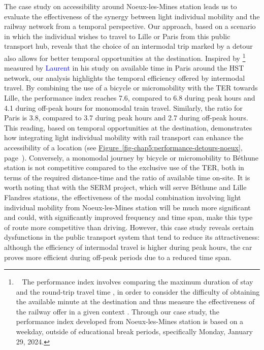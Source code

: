 \begin{refsegment}
The case study on accessibility around Noeux-les-Mines station leads us to evaluate the effectiveness of the synergy between light individual mobility and the railway network from a temporal perspective. Our approach, based on a scenario in which the individual wishes to travel to Lille or Paris from this public transport hub, reveals that the choice of an intermodal trip marked by a detour also allows for better temporal opportunities at the destination. Inspired by \footnote{~
The performance index involves comparing the maximum duration of stay and the round-trip travel time \textcolor{blue}{\autocite[]{cauvin_accessibilite_1989}}, in order to consider the difficulty of obtaining the available minute at the destination and thus measure the effectiveness of the railway offer in a given context \textcolor{blue}{\autocite[130]{chapelon_transports_2016}}. Through our case study, the performance index developed from Noeux-les-Mines station is based on a weekday, outside of educational break periods, specifically Monday, January 29, 2024.
} measured by \textcolor{blue}{Laurent} \textcolor{blue}{\textcite[130]{chapelon_transports_2016}} in his study on available time in Paris around the \acrshort{HST} network, our analysis highlights the temporal efficiency offered by intermodal travel. By combining the use of a bicycle or micromobility with the \acrshort{TER} towards Lille, the performance index reaches 7.6, compared to 6.8 during peak hours and 4.1 during off-peak hours for monomodal train travel. Similarly, the ratio for Paris is 3.8, compared to 3.7 during peak hours and 2.7 during off-peak hours. This reading, based on temporal opportunities at the destination, demonstrates how integrating light individual mobility with rail transport can enhance the accessibility of a location (see \hyperref[fig-chap5:performance-detours-noeux]{Figure~\ref{fig-chap5:performance-detours-noeux}}, page~\pageref{fig-chap5:performance-detours-noeux}). Conversely, a monomodal journey by bicycle or micromobility to Béthune station is not competitive compared to the exclusive use of the \acrshort{TER}, both in terms of the required distance-time and the ratio of available time on-site. It is worth noting that with the \acrfull{SERM} project, which will serve Béthune and Lille Flandres stations, the effectiveness of the modal combination involving light individual mobility from Noeux-les-Mines station will be much more significant and could, with significantly improved frequency and time span, make this type of route more competitive than driving. However, this case study reveals certain dysfunctions in the public transport system that tend to reduce its attractiveness: although the efficiency of intermodal travel is higher during peak hours, the car proves more efficient during off-peak periods due to a reduced time span.%


\end{refsegment}
